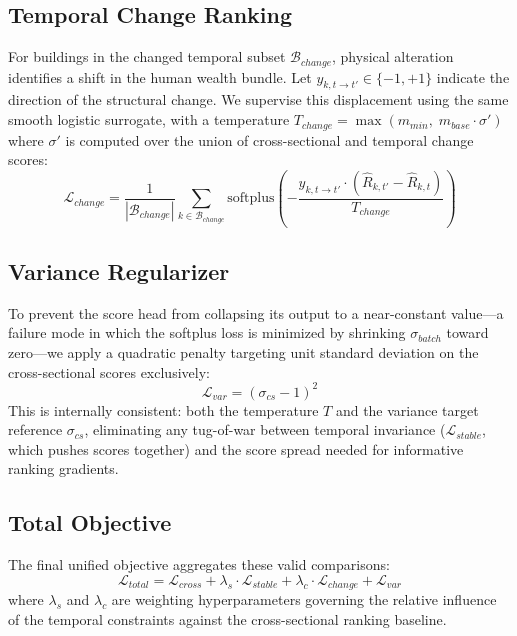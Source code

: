 \documentclass[12pt]{article}
\begin{document}
\subsection{Temporal Change Ranking}
For buildings in the changed temporal subset $\mathcal{B}_{change}$, physical alteration identifies a shift in the human wealth bundle. Let $y_{k, t \to t'} \in \{-1, +1\}$ indicate the direction of the structural change. We supervise this displacement using the same smooth logistic surrogate, with a temperature $T_{change} = \max(m_{min}, \; m_{base} \cdot \sigma')$ where $\sigma'$ is computed over the union of cross-sectional and temporal change scores:
\begin{equation}
\mathcal{L}_{change} = \frac{1}{|\mathcal{B}_{change}|} \sum_{k \in \mathcal{B}_{change}} \text{softplus}\!\left(-\frac{y_{k,t\to t'} \cdot (\hat{R}_{k,t'} - \hat{R}_{k,t})}{T_{change}}\right)
\end{equation}

\subsection{Variance Regularizer}
To prevent the score head from collapsing its output to a near-constant value—a failure mode in which the softplus loss is minimized by shrinking $\sigma_{batch}$ toward zero—we apply a quadratic penalty targeting unit standard deviation on the cross-sectional scores exclusively:
\begin{equation}
\mathcal{L}_{var} = \left(\sigma_{cs} - 1\right)^2
\end{equation}
This is internally consistent: both the temperature $T$ and the variance target reference $\sigma_{cs}$, eliminating any tug-of-war between temporal invariance ($\mathcal{L}_{stable}$, which pushes scores together) and the score spread needed for informative ranking gradients.

\subsection{Total Objective}
The final unified objective aggregates these valid comparisons:
\begin{equation}
\mathcal{L}_{total} = \mathcal{L}_{cross} + \lambda_{s} \cdot \mathcal{L}_{stable} + \lambda_{c} \cdot \mathcal{L}_{change} + \mathcal{L}_{var}
\end{equation}
where $\lambda_s$ and $\lambda_c$ are weighting hyperparameters governing the relative influence of the temporal constraints against the cross-sectional ranking baseline.
\end{document}
